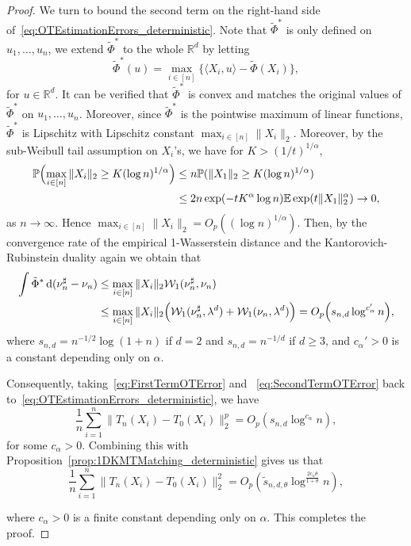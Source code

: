 \documentclass[11pt]{article}
\begin{document}
\begin{proof}
We turn to bound the second term on the right-hand side of~\eqref{eq:OTEstimationErrors_deterministic}. Note that $\tilde{\Phi}^*$ is only defined on $u_1, \ldots, u_n$, we extend $\tilde\Phi^*$ to the whole $\mathbb{R}^d$ by letting 
\[
\tilde\Phi^*(u) = \max_{i \in [n]} \bigl\{\langle X_i, u\rangle - \tilde\Phi(X_i)\bigr\},
\]
for $u \in \mathbb{R}^d$. It can be verified that $\tilde\Phi^*$ is convex and matches the original values of $\tilde\Phi^*$ on $u_1, \ldots, u_n$. Moreover, since $\tilde\Phi^*$ is the pointwise maximum of linear functions, $\tilde\Phi^*$ is Lipschitz with Lipschitz constant $\max_{i \in [n]} \|X_i\|_2$. Moreover, by the sub-Weibull tail assumption on $X_i$'s, we have for $K > (1/t)^{1/\alpha}$,
\begin{align*}
\mathbb{P}\Bigl(\max_{i \in [n]} \|X_i\|_2 \geq K (\log n)^{1/\alpha} \Bigr) &\leq n \mathbb{P}(\|X_1\|_2 \geq K (\log n)^{1/\alpha}) \\
&\leq 2n \exp(-t K^\alpha \log n) \mathbb{E}\exp(t\|X_1\|_2^\alpha) \to 0,
\end{align*}
as $n \to \infty$. Hence $\max_{i \in [n]} \|X_i\|_2 = O_p((\log n)^{1/\alpha})$. Then, by the convergence rate of the empirical 1-Wasserstein distance \citep[see, e.g.,][Theorem~1]{fournier2015rate} and the Kantorovich-Rubinstein duality again we obtain that
\begin{align}
    \int \tilde \Phi^* \, \mathrm{d}(\nu_n^\sharp -  \nu_n) &\leq \max_{i \in [n]} \|X_i\|_2 \mathcal{W}_1(\nu_n^\sharp, {\nu}_n) \notag \\ 
    &\leq \max_{i \in [n]} \|X_i\|_2 \Bigl(\mathcal{W}_1(\nu_n^\sharp, \lambda^d) + \mathcal{W}_1( \nu_n, \lambda^d)\Bigr) = O_p\Bigl(s_{n, d} \log^{c_\alpha'} n\Bigr), \label{eq:SecondTermOTError} 
\end{align}
where $s_{n, d} = n^{-1/2} \log (1+n)$ if $d = 2$ and $s_{n, d} = n^{-1/d}$ if $d \geq 3$, and $c_\alpha'>0$ is a constant depending only on $\alpha$. 

Consequently, taking~\eqref{eq:FirstTermOTError} and ~\eqref{eq:SecondTermOTError} back to~\eqref{eq:OTEstimationErrors_deterministic}, we have
\[
\frac{1}{n}\sum_{i = 1}^n \bigl\| T_n (X_i) - T_0(X_i)\bigr\|_2^p = O_p(s_{n, d} \log^{c_\alpha} n),
\]
for some $c_\alpha > 0$. Combining this with Proposition~\ref{prop:1DKMTMatching_deterministic} gives us that
\[
\frac{1}{n}\sum_{i = 1}^n \bigl\| T_n (X_i) - T_0(X_i)\bigr\|_2^2 = O_p(\tilde s_{n, d, \theta} \log^{\frac{2c_{\alpha} \theta}{1 + \theta}} n), 
\]


where $c_{\alpha} > 0$ is a finite constant depending only on $\alpha$. This completes the proof.
\end{proof}
\end{document}
